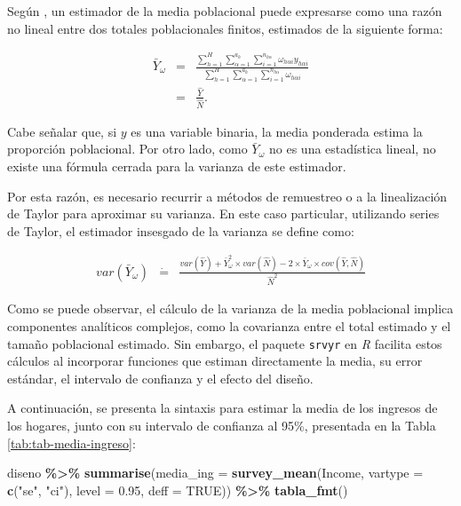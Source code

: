 \documentclass[
  spanish,
  12pt,
]{book}
\newenvironment{Shaded}{\begin{snugshade}}{\end{snugshade}}
\newcommand{\AttributeTok}[1]{\textcolor[rgb]{0.13,0.29,0.53}{#1}}
\newcommand{\ConstantTok}[1]{\textcolor[rgb]{0.56,0.35,0.01}{#1}}
\newcommand{\FloatTok}[1]{\textcolor[rgb]{0.00,0.00,0.81}{#1}}
\newcommand{\FunctionTok}[1]{\textcolor[rgb]{0.13,0.29,0.53}{\textbf{#1}}}
\newcommand{\NormalTok}[1]{#1}
\newcommand{\SpecialCharTok}[1]{\textcolor[rgb]{0.81,0.36,0.00}{\textbf{#1}}}
\newcommand{\StringTok}[1]{\textcolor[rgb]{0.31,0.60,0.02}{#1}}
\begin{document}
Según \citet{Gutierrez2016}, un estimador de la media poblacional puede expresarse como una razón no lineal entre dos totales poblacionales finitos, estimados de la siguiente forma:

\begin{eqnarray*}
\bar{Y}_{\omega} & = & \frac{\sum_{h=1}^{H}\sum_{\alpha=1}^{a_{h}}\sum_{i=1}^{n_{h\alpha}}\omega_{h\alpha i}y_{h\alpha i}}{\sum_{h=1}^{H}\sum_{\alpha=1}^{a_{h}}\sum_{i=1}^{n_{h\alpha}}\omega_{h\alpha i}}\\
 & = & \frac{\hat{Y}}{\hat{N}}.
\end{eqnarray*}

Cabe señalar que, si \(y\) es una variable binaria, la media ponderada estima la proporción poblacional. Por otro lado, como \(\bar{Y}_{\omega}\) no es una estadística lineal, no existe una fórmula cerrada para la varianza de este estimador.

Por esta razón, es necesario recurrir a métodos de remuestreo o a la linealización de Taylor para aproximar su varianza. En este caso particular, utilizando series de Taylor, el estimador insesgado de la varianza se define como:

\begin{eqnarray*}
var\left(\bar{Y}_{\omega}\right) & \dot{=} & \frac{var\left(\hat{Y}\right)+\bar{Y}_{\omega}^{2}\times var\left(\hat{N}\right)-2\times\bar{Y}_{\omega}\times cov\left(\hat{Y},\hat{N}\right)}{\hat{N}^{2}}
\end{eqnarray*}

Como se puede observar, el cálculo de la varianza de la media poblacional implica componentes analíticos complejos, como la covarianza entre el total estimado y el tamaño poblacional estimado. Sin embargo, el paquete \texttt{srvyr} en \emph{R} facilita estos cálculos al incorporar funciones que estiman directamente la media, su error estándar, el intervalo de confianza y el efecto del diseño.

A continuación, se presenta la sintaxis para estimar la media de los ingresos de los hogares, junto con su intervalo de confianza al 95\%, presentada en la Tabla \ref{tab:tab-media-ingreso}:

\begin{Shaded}
\begin{Highlighting}[]
\NormalTok{diseno }\SpecialCharTok{\%\textgreater{}\%}
  \FunctionTok{summarise}\NormalTok{(}\AttributeTok{media\_ing =} \FunctionTok{survey\_mean}\NormalTok{(Income,}
                                \AttributeTok{vartype =} \FunctionTok{c}\NormalTok{(}\StringTok{"se"}\NormalTok{, }\StringTok{"ci"}\NormalTok{),}
                                \AttributeTok{level =} \FloatTok{0.95}\NormalTok{,}
                                \AttributeTok{deff =} \ConstantTok{TRUE}\NormalTok{)) }\SpecialCharTok{\%\textgreater{}\%}
  \FunctionTok{tabla\_fmt}\NormalTok{()}
\end{Highlighting}
\end{Shaded}
\end{document}
